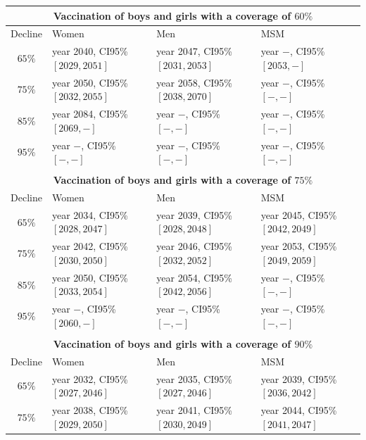 \begin{table}
	\hspace*{-6em}%
	\centering
	\small
	\begin{tabular}{c|lll}
        \\
        \hline
        \multicolumn{4}{c}{\textbf{Vaccination of boys and girls with a coverage of $60\%$}}\\
        \hline
        Decline & Women &  Men & MSM \\ 
        \hline		
$ 65 \%$ & year 2040, CI95\% $[ 2029 , 2051 ]$ & year  2047, CI95\% $[ 2031 , 2053 ]$ & year $-$, CI95\% $[ 2053, - ]$ \\
$ 75 \%$ & year 2050, CI95\% $[ 2032 , 2055 ]$ & year  2058, CI95\% $[ 2038, 2070 ]$ & year  $-$, CI95\% $[ - , - ]$ \\
$ 85 \%$ & year 2084, CI95\% $[ 2069, - ]$ & year  $-$, CI95\% $[ - , - ]$ & year  $-$, CI95\% $[ - , - ]$ \\
$ 95 \%$ & year $-$, CI95\% $[ - , - ]$ & year  $-$, CI95\% $[ - , - ]$ & year  $-$, CI95\% $[ - , - ]$ \\
		\\
		\hline 		
		\multicolumn{4}{c}{\textbf{Vaccination of boys and girls with a coverage of $75\%$}}\\
		\hline
		Decline & Women &  Men & MSM \\ 
		\hline 
$ 65 \%$ & year 2034, CI95\% $[ 2028 , 2047 ]$ & year 2039, CI95\% $[ 2028 , 2048 ]$ & year 2045, CI95\% $[ 2042 , 2049 ]$ \\
$ 75 \%$ & year 2042, CI95\% $[ 2030 , 2050 ]$ & year 2046, CI95\% $[ 2032 , 2052 ]$ & year 2053, CI95\% $[ 2049 , 2059 ]$ \\
$ 85 \%$ & year 2050, CI95\% $[ 2033 , 2054 ]$ & year 2054, CI95\% $[ 2042 , 2056 ]$ & year $-$, CI95\% $[ - , - ]$ \\
$ 95 \%$ & year $-$, CI95\% $[ 2060 , - ]$ & year $-$, CI95\% $[ - , - ]$ & year $-$, CI95\% $[ - , - ]$ \\
         \\
         \hline
         \multicolumn{4}{c}{\textbf{Vaccination of boys and girls with a coverage of $90\%$}}\\
         \hline
         Decline & Women &  Men & MSM \\ 
         \hline
$ 65 \%$ & year 2032, CI95\% $[ 2027 , 2046 ]$ & year 2035, CI95\% $[ 2027 , 2046 ]$ & year 2039, CI95\% $[ 2036 , 2042 ]$ \\
$ 75 \%$ & year 2038, CI95\% $[ 2029 , 2050 ]$ & year 2041, CI95\% $[ 2030 , 2049 ]$ & year 2044, CI95\% $[ 2041 , 2047 ]$ \\

\end{tabular}
\end{table}
